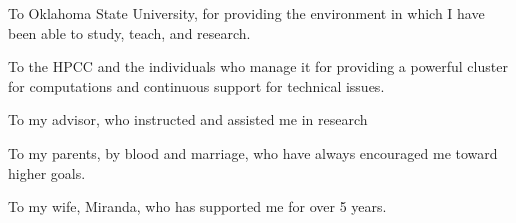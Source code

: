 \begin{acknowledge}

To Oklahoma State University, for providing the environment in which I have been able to study, teach, and research.

To the HPCC and the individuals who manage it for providing a powerful cluster for computations and continuous support for technical issues.

To my advisor, who instructed and assisted me in research

To my parents, by blood and marriage, who have always encouraged me toward higher goals.

To my wife, Miranda, who has supported me for over 5 years. 


\end{acknowledge}
